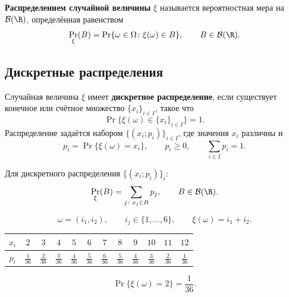 \begin{definition}
    \textbf{Распределением случайной величины} $\xi$ называется
    вероятностная мера на $\mathcal{B}(\R)$, определённая равенством
    \[
        \Pr_\xi(B)=\Pr\{\omega\in\Omega\colon\xi(\omega)\in B\},
        \qquad B\in\mathcal{B}(\R).
    \]
\end{definition}

\begin{center}
\end{center}

\subsection{Дискретные распределения}

\begin{definition}
    Случайная величина $\xi$ имеет \textbf{дискретное распределение},
    если существует конечное или счётное множество $\{x_i\}_{i\in I}$,
    такое что
    \[
        \Pr\{\xi(\omega)\in\{x_i\}_{i\in I}\}=1.
    \]
    Распределение задаётся набором $\{(x_i;p_i)\}_{i\in I}$,
    где значения $x_i$ различны и
    \[
        p_i=\Pr\{\xi(\omega)=x_i\},\qquad
        p_i\geq0,\qquad \sum_{i\in I}p_i=1.
    \]
\end{definition}

Для дискретного распределения $\{(x_i;p_i)\}_i$:
\[
    \Pr_\xi(B)=\sum_{j\colon x_j\in B}p_j,
    \qquad B\in\mathcal{B}(\R).
\]

\begin{example}
    \[
        \omega=(i_1,i_2),\qquad i_j\in\{1,\ldots,6\},
        \qquad \xi(\omega)=i_1+i_2.
    \]
    \begin{center}
        \renewcommand{\arraystretch}{1.7}
        \setlength{\tabcolsep}{5pt}
        \begin{tabular}{c|*{11}{c}}
            $x_i$ & $2$ & $3$ & $4$ & $5$ & $6$ & $7$
                  & $8$ & $9$ & $10$ & $11$ & $12$ \\
            \hline
            $p_i$ & $\frac1{36}$ & $\frac2{36}$ & $\frac3{36}$
                  & $\frac4{36}$ & $\frac5{36}$ & $\frac6{36}$
                  & $\frac5{36}$ & $\frac4{36}$ & $\frac3{36}$
                  & $\frac2{36}$ & $\frac1{36}$
        \end{tabular}
    \end{center}
    \[
        \Pr\{\xi(\omega)=2\}=\frac1{36}.
    \]
\end{example}

